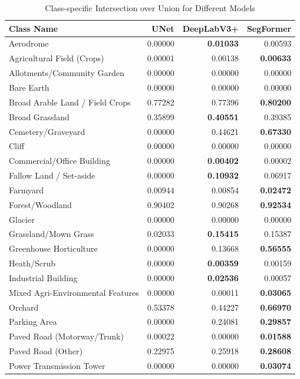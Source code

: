 \documentclass{report}
\begin{document}
\begin{table}[H]
\centering
\caption{Class-specific Intersection over Union for Different Models}
\label{tab:class_specific_iou_models_bold}
\begin{tabular}{lrrr}
\toprule
Class Name & UNet & DeepLabV3+ & SegFormer \\
\midrule
Aerodrome & 0.00000 & \textbf{0.01033} & 0.00593 \\
Agricultural Field (Crops) & 0.00001 & 0.00138 & \textbf{0.00633} \\
Allotments/Community Garden & 0.00000 & 0.00000 & 0.00000 \\
Bare Earth & 0.00000 & 0.00000 & 0.00000 \\
Broad Arable Land / Field Crops & 0.77282 & 0.77396 & \textbf{0.80200} \\
Broad Grassland & 0.35899 & \textbf{0.40551} & 0.39385 \\
Cemetery/Graveyard & 0.00000 & 0.44621 & \textbf{0.67330} \\
Cliff & 0.00000 & 0.00000 & 0.00000 \\
Commercial/Office Building & 0.00000 & \textbf{0.00402} & 0.00002 \\
Fallow Land / Set-aside & 0.00000 & \textbf{0.10932} & 0.06917 \\
Farmyard & 0.00944 & 0.00854 & \textbf{0.02472} \\
Forest/Woodland & 0.90402 & 0.90268 & \textbf{0.92534} \\
Glacier & 0.00000 & 0.00000 & 0.00000 \\
Grassland/Mown Grass & 0.02033 & \textbf{0.15415} & 0.15387 \\
Greenhouse Horticulture & 0.00000 & 0.13668 & \textbf{0.56555} \\
Heath/Scrub & 0.00000 & \textbf{0.00359} & 0.00159 \\
Industrial Building & 0.00000 & \textbf{0.02536} & 0.00057 \\
Mixed Agri-Environmental Features & 0.00000 & 0.00011 & \textbf{0.03065} \\
Orchard & 0.53378 & 0.44227 & \textbf{0.66970} \\
Parking Area & 0.00000 & 0.24081 & \textbf{0.29857} \\
Paved Road (Motorway/Trunk) & 0.00022 & 0.00000 & \textbf{0.01588} \\
Paved Road (Other) & 0.22975 & 0.25918 & \textbf{0.28608} \\
Power Transmission Tower & 0.00000 & 0.00000 & \textbf{0.03074} \\

\end{tabular}
\end{table}
\end{document}
